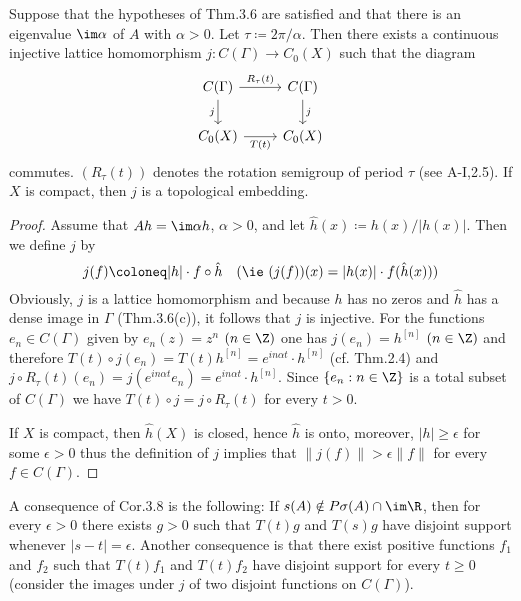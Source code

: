 \begin{corollary}\label{cor:b3-3.8}
Suppose that the hypotheses of Thm.3.6 are satisfied and that there is an eigenvalue $\im \alpha$ of $A$ with $\alpha > 0$.
Let $\tau \coloneq 2\pi/\alpha$.
Then there exists a continuous injective lattice homomorphism $j : C(\Gamma) \to C_{0}(X)$ such that the diagram
\[
\begin{tikzcd}
C(\Gamma) \arrow[r, "R_{\tau}(t)"] \arrow[d, "j"'] & C(\Gamma) \arrow[d, "j"] \\
C_{0}(X) \arrow[r, "T(t)"'] & C_{0}(X)
\end{tikzcd}
\]
commutes. 
$(R_{\tau}(t))$ denotes the rotation semigroup of period $\tau$ (see A-I,2.5).
If $X$ is compact, then $j$ is a topological embedding.
\end{corollary}
\begin{proof}
	Assume that $Ah = \im\alpha h$, $\alpha > 0$, and let $\hat{h}(x) \coloneq h(x)/|h(x)|$.
	Then we define $j$ by
	\begin{equation}\label{eq:b3-3.9}
	j(f) \coloneq |h|\cdot f\circ\hat{h} \quad \text{(\ie }(j(f))(x) = |h(x)|\cdot f(\hat{h}(x)))
	\end{equation}
	Obviously, $j$ is a lattice homomorphism and because $h$ has no zeros and $\hat{h}$ has a dense image in $\Gamma$ (Thm.3.6(c)), it follows that $j$ is injective.
	For the functions $e_{n} \in C(\Gamma)$ given by $e_{n}(z) = z^{n}$ $(n \in \Z)$ one has $j(e_{n}) = h^{[n]}$ $(n \in \Z)$ and therefore 
	$T(t)\circ j(e_{n}) = T(t)h^{[n]} = e^{in\alpha t}\cdot h^{[n]}$ (cf. Thm.2.4) and $j\circ R_{\tau}(t)(e_{n}) = j(e^{in\alpha t}e_{n}) = e^{in\alpha t}\cdot h^{[n]}$.
	Since $\{e_{n} : n \in \Z\}$ is a total subset of $C(\Gamma)$ we have $T(t)\circ j = j\circ R_{\tau}(t)$ for every $t > 0$.
	
	If $X$ is compact, then $\hat{h}(X)$ is closed, hence $\hat{h}$ is onto, moreover, $|h| \geq \epsilon$ for some $\epsilon > 0$ thus the definition of $j$ implies that $\|j(f)\| > \epsilon\|f\|$ for every $f \in C(\Gamma)$.
\end{proof}
A consequence of Cor.3.8 is the following: If $s(A) \notin P\sigma(A)\cap \im\R$, then for every $\epsilon > 0$ there exists $g > 0$ such that $T(t)g$ and $T(s)g$ have disjoint support whenever $|s - t| = \epsilon$.
Another consequence is that there exist positive functions $f_{1}$ and $f_{2}$ such that $T(t)f_{1}$ and $T(t)f_{2}$ have disjoint support for every $t \geq 0$ (consider the images under $j$ of two disjoint functions on $C(\Gamma)$).
